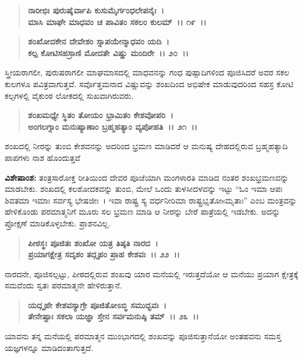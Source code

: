\begin{verse}
\textbf{ನಾರೀಭಿಃ ಪುರುಷೈರ್ವಾಪಿ ಕುಸುಮೈರ್ಗಂಧಲೇಪನೈಃ~।}\\\textbf{ಮಾಸಿ ಮಾಘೇ ಮಾಧವಂ ಚ ಪಾವಿತಂ ಸಕಲಂ ಕುಲಮ್~।। ೧೯~।। }
\end{verse}

\begin{verse}
\textbf{ಶಂಖೋದಕೇನ ದೇವೇಶಂ ಸ್ನಾಪಯೇನ್ಮಾಧವಂ ಯದಿ~।}\\\textbf{ಕಲ್ಪ ಕೋಟಿಸಹಸ್ರಾಣಿ ಮೋದತೇ ವಿಷ್ಣು ಮಂದಿರೇ~।। ೨೦~।।}
\end{verse}

ಸ್ತ್ರೀಯರಾಗಲೀ, ಪುರುಷರಾಗಲೀ ಮಾಘಮಾಸದಲ್ಲಿ ಮಾಧವನನ್ನು ಗಂಧ ಪುಷ್ಪಾದಿಗಳಿಂದ ಪೂಜಿಸಿದರೆ ಅವರ ಸಕಲ ಕುಲಗಳೂ ಪವಿತ್ರವಾಗುತ್ತವೆ. ಸರ್ವೊತ್ತಮನಾದ ವಿಷ್ಣುವನ್ನು ಶಂಖದಿಂದ ಅಭಿಷೇಕ ಮಾಡುವುದರಿಂದ ಸಹಸ್ರ ಕೋಟಿ ಕಲ್ಪಗಳಲ್ಲಿ ವೈಕುಂಠ ಲೋಕದಲ್ಲಿ ಸುಖವಾಗಿರುವರು.

\begin{verse}
\textbf{ಶಂಖಮಧ್ಯೇ ಸ್ಥಿತಂ ತೋಯಂ ಭ್ರಾಮಿತಂ ಕೇಶವೋಪರಿ~।}\\\textbf{ಅಂಗಲಗ್ನಾಂ ಮನುಷ್ಯಾಣಾಂ ಬ್ರಹ್ಮಹತ್ಯಾಂ ವ್ಯಪೋಹತಿ~।। ೨೧~।।}
\end{verse}

ಶಂಖದಲ್ಲಿ ನೀರನ್ನು ತುಂಬಿ ಕೇಶವನನ್ನು ಅದರಿಂದ ಭ್ರಮಣ ಮಾಡಿದರೆ ಆ ಮನುಷ್ಯ ದೇಹದಲ್ಲಿರುವ ಬ್ರಹ್ಮಹತ್ಯಾದಿ ಪಾಪಗಳು ನಾಶ ಹೊಂದುತ್ತವೆ

\begin{myquote}
\textbf{ವಿಶೇಷಾಂಶ:} ತಂತ್ರಸಾರೋಕ್ತ ರೀತಿಯಿಂದ ದೇವರ ಪೂಜೆಯಾಗಿ ಮಂಗಳಾರತಿ ಮಾಡಿದ ನಂತರ ಶಂಖಭ್ರಮಣವನ್ನು ಮಾಡಬೇಕು. ಶಂಖದಲ್ಲಿ ಕಲಶೋದಕವನ್ನು ತುಂಬಿ, ಮೇಲೆ ಒಂದು ತುಳಸೀದಳವನ್ನು ಇಟ್ಟು “ಓಂ ಇಮಾ ಆಪಃ ಶಿವತಮಾ ಇಮಾಃ ಸರ್ವಸ್ಯ ಭೇಷಜೀಃ~। ಇವಾ ರಾಷ್ಟ್ರ ಸ್ಯ ವರ್ಧನೀರಿಮಾ ರಾಷ್ಟ್ರಭೃತೋsಮೃತಾಃ” ಎಂಬ ಮಂತ್ರವನ್ನು ಹೇಳಿಕೊಂಡು ಪರಮಾತ್ಮನಿಗೆ ಮೂರು ಸಲ ಭ್ರಮಣ ಮಾಡಿ ಆ ನೀರನ್ನು ಬೇರೆ ಪಾತ್ರೆಯಲ್ಲಿ ಇಡಬೇಕು. ಅದನ್ನು ಪ್ರೋಕ್ಷಣೆ ಮಾಡಿಕೊಳ್ಳಬೇಕು. ಪ್ರಾಶನವಿಲ್ಲ.
\end{myquote}

\begin{verse}
\textbf{ಪೀಠಸ್ಥಃ ಪೂಜಿತಃ ಶಂಖೋ ಯತ್ರ ತಿಷ್ಠತಿ ನಾರದ~।}\\\textbf{ಪ್ರಯಾಗಕ್ಷೇತ್ರ ಸದೃಶಂ ತದ್ಗೃಹಂ ಪ್ರಾಹ ಕೇಶವಃ~।। ೨೨~।।}
\end{verse}

ನಾರದನೇ, ಪೂಜಿಸಲ್ಪಟ್ಟು, ಪೀಠದಲ್ಲಿರುವ ಶಂಖವು ಯಾರ ಮನೆಯಲ್ಲಿ ಇರುತ್ತದೆಯೋ ಆ ಮನೆಯು ಪ್ರಯಾಗ ಕ್ಷೇತ್ರಕ್ಕೆ ಸಮವೆಂದು ಸ್ವತಃ ಪರಮಾತ್ಮನೇ ಹೇಳಿರುತ್ತಾನೆ.

\begin{verse}
\textbf{ಯದ್ಗೃಹೇ ಕೇಶವಸ್ಯಾಗ್ರೇ ಪೂಜಿತೋಽಬ್ಧಿ ಸಮುದ್ಭವಃ~।}\\\textbf{ತೇನೇಷ್ಟಾಃ ಸಕಲಾ ಯಜ್ಞಾ ಸ್ತೇನ ಸರ್ವಮನುಷ್ಠಿ ತಮ್~।। ೨೩~।।}
\end{verse}

ಯಾವನು ತನ್ನ ಮನೆಯಲ್ಲಿ ಪರಮಾತ್ಮನ ಮುಂಭಾಗದಲ್ಲಿ ಶಂಖವನ್ನು ಪೂಜಿಸುತ್ತಾನೆಯೋ ಅಂತಹವನು ಸಮಸ್ತ ಯಜ್ಞಗಳನ್ನೂ ಮಾಡಿದಂತಾಗುತ್ತದೆ.


